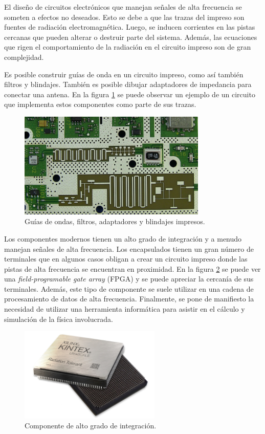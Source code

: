 \documentclass[
    11pt,
    spanish,
    a4paper
]{article}
\begin{document}

El diseño de circuitos electrónicos que manejan señales de alta frecuencia se someten a efectos no deseados.
Esto se debe a que las trazas del impreso son fuentes de radiación electromagnética.
Luego, se inducen corrientes en las pistas cercanas que pueden alterar o destruir parte del sistema.
Además, las ecuaciones que rigen el comportamiento de la radiación en el circuito impreso son de gran complejidad.

Es posible construir guías de onda en un circuito impreso, como así también filtros y blindajes.
También es posible dibujar adaptadores de impedancia para conectar una antena.
En la figura \ref{fig:pcb} se puede observar un ejemplo de un circuito que implementa estos componentes como parte de sus trazas.

\begin{figure}[htbp]
	\centering
	\includegraphics[width=0.8\textwidth]{img/pcb.jpg}
	\caption{Guías de ondas, filtros, adaptadores y blindajes impresos.}
	\label{fig:pcb}
\end{figure}

Los componentes modernos tienen un alto grado de integración y a menudo manejan señales de alta frecuencia.
Los encapsulados tienen un gran número de terminales que en algunos casos obligan a crear un circuito impreso donde las pistas de alta frecuencia se encuentran en proximidad.
En la figura \ref{fig:fpga} se puede ver una \emph{field-programable gate array} (FPGA) y se puede apreciar la cercanía de sus terminales.
Además, este tipo de componente se suele utilizar en una cadena de procesamiento de datos de alta frecuencia.
Finalmente, se pone de manifiesto la necesidad de utilizar una herramienta informática para asistir en el cálculo y simulación de la física involucrada.

\begin{figure}[htbp]
	\centering
	\includegraphics[width=0.6\textwidth]{img/fpga.jpg}
	\caption{Componente de alto grado de integración.}
	\label{fig:fpga}
\end{figure}
\end{document}
